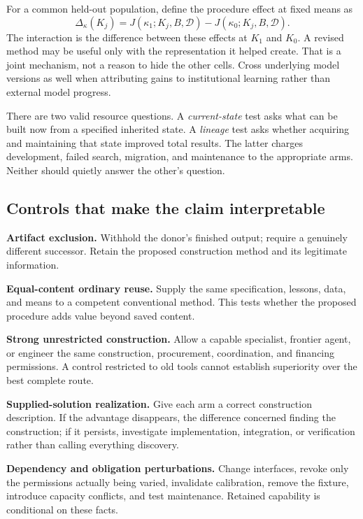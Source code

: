 For a common held-out population, define the procedure effect at fixed means as
\begin{equation}
\Delta_{\kappa}(K_j)=J(\kappa_1;K_j,B,\mathcal D)-J(\kappa_0;K_j,B,\mathcal D).
\end{equation}
The interaction is the difference between these effects at $K_1$ and $K_0$. A revised method may be useful only with the representation it helped create. That is a joint mechanism, not a reason to hide the other cells. Cross underlying model versions as well when attributing gains to institutional learning rather than external model progress.

There are two valid resource questions. A \emph{current-state} test asks what can be built now from a specified inherited state. A \emph{lineage} test asks whether acquiring and maintaining that state improved total results. The latter charges development, failed search, migration, and maintenance to the appropriate arms. Neither should quietly answer the other's question.

\subsection{Controls that make the claim interpretable}

\textbf{Artifact exclusion.} Withhold the donor's finished output; require a genuinely different successor. Retain the proposed construction method and its legitimate information.

\textbf{Equal-content ordinary reuse.} Supply the same specification, lessons, data, and means to a competent conventional method. This tests whether the proposed procedure adds value beyond saved content.

\textbf{Strong unrestricted construction.} Allow a capable specialist, frontier agent, or engineer the same construction, procurement, coordination, and financing permissions. A control restricted to old tools cannot establish superiority over the best complete route.

\textbf{Supplied-solution realization.} Give each arm a correct construction description. If the advantage disappears, the difference concerned finding the construction; if it persists, investigate implementation, integration, or verification rather than calling everything discovery.

\textbf{Dependency and obligation perturbations.} Change interfaces, revoke only the permissions actually being varied, invalidate calibration, remove the fixture, introduce capacity conflicts, and test maintenance. Retained capability is conditional on these facts.

